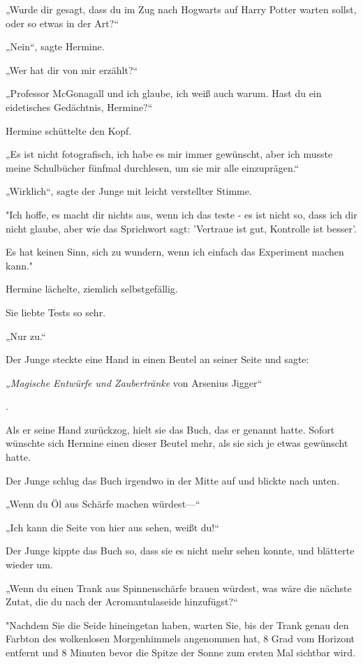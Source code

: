 {„Wurde dir gesagt, dass du im Zug nach Hogwarts auf Harry Potter warten sollst, oder so etwas in der Art?“

„Nein“, sagte Hermine.

„Wer hat dir von mir erzählt?“

„Professor McGonagall und ich glaube, ich weiß auch warum. Hast du ein eidetisches Gedächtnis, Hermine?“

Hermine schüttelte den Kopf.

„Es ist nicht fotografisch, ich habe es mir immer gewünscht, aber ich musste meine Schulbücher fünfmal durchlesen, um sie mir alle einzuprägen.“

„Wirklich“, sagte der Junge mit leicht verstellter Stimme.

"Ich hoffe, es macht dir nichts aus, wenn ich das teste - es ist nicht so, dass ich dir nicht glaube, aber wie das Sprichwort sagt: 'Vertraue ist gut, Kontrolle ist besser'.

Es hat keinen Sinn, sich zu wundern, wenn ich einfach das Experiment machen kann."

Hermine lächelte, ziemlich selbstgefällig.

Sie liebte Tests so sehr.

„Nur zu.“

Der Junge steckte eine Hand in einen Beutel an seiner Seite und sagte:

\emph{„Magische Entwürfe und Zaubertränke} von Arsenius Jigger“

.

Als er seine Hand zurückzog, hielt sie das Buch, das er genannt hatte. Sofort wünschte sich Hermine einen dieser Beutel mehr, als sie sich je etwas gewünscht hatte.

Der Junge schlug das Buch irgendwo in der Mitte auf und blickte nach unten.

„Wenn du Öl aus Schärfe machen würdest—“

„Ich kann die Seite von hier aus sehen, weißt du!“

Der Junge kippte das Buch so, dass sie es nicht mehr sehen konnte, und blätterte wieder um.

„Wenn du einen Trank aus Spinnenschärfe brauen würdest, was wäre die nächste Zutat, die du nach der Acromantulaseide hinzufügst?“

"Nachdem Sie die Seide hineingetan haben, warten Sie, bis der Trank genau den Farbton des wolkenlosen Morgenhimmels angenommen hat, 8 Grad vom Horizont entfernt und 8 Minuten bevor die Spitze der Sonne zum ersten Mal sichtbar wird.

}
